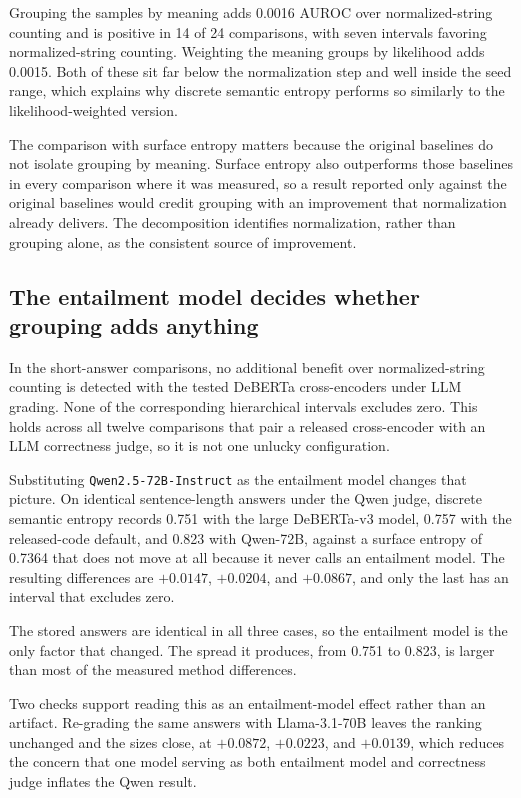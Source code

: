 Grouping the samples by meaning adds 0.0016 AUROC over normalized-string
counting and is positive in 14 of 24 comparisons, with seven intervals favoring
normalized-string counting. Weighting the meaning groups by likelihood adds
0.0015. Both of these sit far below the normalization step and well inside the
seed range, which explains why discrete semantic entropy performs so similarly
to the likelihood-weighted version.

The comparison with surface entropy matters because the original baselines do
not isolate grouping by meaning. Surface entropy also outperforms those
baselines in every comparison where it was measured, so a result reported only
against the original baselines would credit grouping with an improvement that
normalization already delivers. The decomposition identifies normalization,
rather than grouping alone, as the consistent source of improvement.

\subsection{The entailment model decides whether grouping adds anything}

In the short-answer comparisons, no additional benefit over normalized-string
counting is detected with the tested DeBERTa cross-encoders under LLM grading.
None of the corresponding hierarchical intervals excludes zero. This holds
across all twelve comparisons that pair a released cross-encoder with an LLM
correctness judge, so it is not one unlucky configuration.

Substituting \texttt{Qwen2.5-72B-Instruct} as the entailment model changes that
picture. On identical sentence-length answers under the Qwen judge, discrete
semantic entropy records 0.751 with the large DeBERTa-v3 model, 0.757 with the
released-code default, and 0.823 with Qwen-72B, against a surface entropy of
0.7364 that does not move at all because it never calls an entailment model.
The resulting differences are $+0.0147$, $+0.0204$, and $+0.0867$, and only the
last has an interval that excludes zero.

The stored answers are identical in
all three cases, so the entailment model is the only factor that changed. The
spread it produces, from 0.751 to 0.823, is larger than most of the measured
method differences.

Two checks support reading this as an entailment-model effect rather than an
artifact. Re-grading the same answers with Llama-3.1-70B leaves the ranking
unchanged and the sizes close, at $+0.0872$, $+0.0223$, and $+0.0139$, which
reduces the concern that one model serving as both entailment model and
correctness judge inflates the Qwen result.

